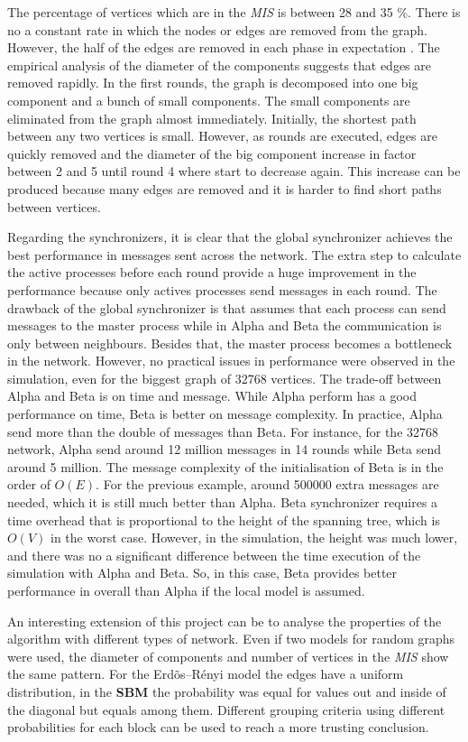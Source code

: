 The percentage of vertices which are in the \textit{MIS} is between 28 and 35 \%. There is no a constant rate in which the nodes or edges are removed from the graph. However, the half of the edges are removed in each phase in expectation \cite{yves2009optimal}. The empirical analysis of the diameter of the components suggests that edges are removed rapidly. In the first rounds, the graph is decomposed into one big component and a bunch of small components. The small components are eliminated from the graph almost immediately. Initially, the shortest path between any two vertices is small. However, as rounds are executed, edges are quickly removed and the diameter of the big component increase in factor between 2 and 5 until round 4 where start to decrease again. This increase can be produced because many edges are removed and it is harder to find short paths between vertices.  

Regarding the synchronizers, it is clear that the global synchronizer achieves the best performance in messages sent across the network. The extra step to calculate the active processes before each round provide a huge improvement in the performance because only actives processes send messages in each round. The drawback of the global synchronizer is that assumes that each process can send messages to the master process while in Alpha and Beta the communication is only between neighbours. Besides that, the master process becomes a bottleneck in the network. However, no practical issues in performance were observed in the simulation, even for the biggest graph of 32768 vertices. The trade-off between Alpha and Beta is on time and message. While Alpha perform has a good performance on time, Beta is better on message complexity. In practice, Alpha send more than the double of messages than Beta. For instance, for the 32768 network, Alpha send around 12 million messages in 14 rounds while Beta send around 5 million. The message complexity of the initialisation of Beta is in the order of $O(E)$. For the previous example, around 500000 extra messages are needed, which it is still much better than Alpha. Beta synchronizer requires a time overhead that is proportional to the height of the spanning tree, which is $O(V)$ in the worst case. However, in the simulation, the height was much lower, and there was no a significant difference between the time execution of the simulation with Alpha and Beta. So, in this case, Beta provides better performance in overall than Alpha if the local model is assumed.

An interesting extension of this project can be to analyse the properties of the algorithm with different types of network. Even if two models for random graphs were used, the diameter of components and number of vertices in the \textit{MIS} show the same pattern.  For the Erd\~os--R\'enyi model the edges have a uniform distribution, in the \textbf{SBM} the probability was equal for values out and inside of the diagonal but equals among them. Different grouping criteria using different probabilities for each block can be used to reach a more trusting conclusion.







\newpage

